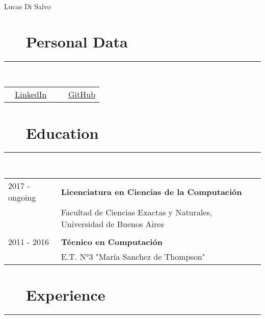 \documentclass{article}
\begin{document}
\pagestyle{empty}

\par{\centering
		{\huge Lucas Di Salvo}
	\bigskip\par}

\section*{\faAt ~~ Personal Data} 
\hrule

\
\newline
\

\begin{tabular}{l | l}
      \faLinkedin ~ \href{https://www.linkedin.com/in/lucas-di-salvo-6578b915a}{LinkedIn} \
     & \faGithub ~ \href{https://github.com/lucasDS-0}{GitHub} 
\end{tabular}

\section*{\faBook ~~ Education} 
\hrule

\
\newline
\

\begin{tabular}{l l}
    2017 - ongoing  & \textbf{Licenciatura en Ciencias de la Computación}\\
                    & Facultad de Ciencias Exactas y Naturales, Universidad de Buenos Aires \\ \\
    2011 - 2016 & \textbf{Técnico en Computación} \\
                & E.T. N°3 "María Sanchez de Thompson"
\end{tabular}

\section*{\faCubes ~~ Experience} 
\hrule

\
\newline
\
\end{document}
